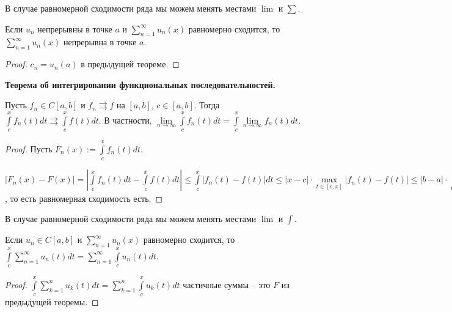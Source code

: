 \begin{remark}
    В случае равномерной сходимости ряда мы можем менять местами $\lim$ и $\sum$.
\end{remark}

\begin{corollary}
    Если $u_n$ непрерывны в точке $a$ и $\sum\limits_{n=1}^\infty u_n(x)$ равномерно сходится, то $\sum\limits_{n=1}^\infty u_n(x)$ непрерывна в точке $a.$
\end{corollary}

\begin{proof}
    $c_n=u_n(a)$ в предыдущей теореме.
\end{proof}

\begin{theorem}
    \textbf{Теорема об интегрировании функциональных последовательностей.}
    
    Пусть $f_n\in C[a, b]$ и $f_n\rightrightarrows f$ на $[a, b]$, $c\in [a, b]$. Тогда $\int\limits_c^x f_n(t)dt\rightrightarrows \int\limits_c^x f(t)dt$. В частности, $\lim\limits_{n\rightarrow \infty}\int\limits_c^x f_n(t)dt=\int\limits_c^x\lim\limits_{n\rightarrow \infty }f_n(t) dt$.
\end{theorem}

\begin{proof} %
    Пусть $F_n(x):=\int\limits_c^x f_n(t)dt$.

    $|F_n(x)-F(x)|=|\int\limits_c^x f_n(t)dt-\int\limits_c^x f(t)dt|\leq \int\limits_c^x |f_n(t)-f(t)|dt\leq |x-c|\cdot \max\limits_{t\in [c, x]}|f_n(t)-f(t)|\leq |b-a|\cdot \sup\limits_{t\in [a, b]}|f_n(t)-f(t)|\rightarrow 0$, то есть равномерная сходимость есть.
\end{proof}

\begin{remark}
    В случае равномерной сходимости ряда мы можем менять местами $\lim$ и $\int$.
\end{remark}

\begin{corollary}
    Если $u_n\in C[a, b]$ и $\sum\limits_{n=1}^\infty u_n(x)$ равномерно сходится, то $\int\limits_c^x \sum\limits_{n=1}^\infty u_n(t)dt = \sum\limits_{n=1}^\infty \int\limits_c^x u_n(t)dt$.
\end{corollary}

\begin{proof}
    $\int\limits_c^x \sum\limits_{k=1}^n u_k(t)dt=\sum\limits_{k=1}^n \int\limits_c^x u_k(t)dt$ частичные суммы – это $F$ из предыдущей теоремы.
\end{proof}

